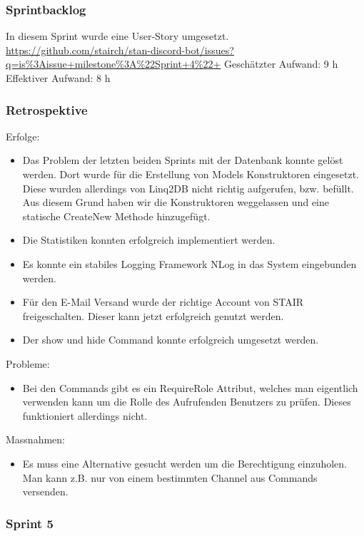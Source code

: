 \documentclass[a4paper, table]{article}
\begin{document}
\subsubsection*{Sprintbacklog}
In diesem Sprint wurde eine User-Story umgesetzt.\\
\url{https://github.com/stairch/stan-discord-bot/issues?q=is%3Aissue+milestone%3A%22Sprint+4%22+}
\newline
Geschätzter Aufwand: 9 h
\newline
Effektiver Aufwand: 8 h

\subsubsection*{Retrospektive}
Erfolge:
\begin{itemize}
    \item Das Problem der letzten beiden Sprints mit der Datenbank konnte gelöst werden.
    Dort wurde für die Erstellung von Models Konstruktoren eingesetzt.
    Diese wurden allerdings von Linq2DB nicht richtig aufgerufen, \gls{bzw.} befüllt.
    Aus diesem Grund haben wir die Konstruktoren weggelassen und eine statische CreateNew Methode hinzugefügt.
    \item Die Statistiken konnten erfolgreich implementiert werden.
    \item Es konnte ein stabiles Logging Framework NLog in das System eingebunden werden.
    \item Für den E-Mail Versand wurde der richtige Account von STAIR freigeschalten.
    Dieser kann jetzt erfolgreich genutzt werden.
    \item Der show und hide Command konnte erfolgreich umgesetzt werden.
\end{itemize}
Probleme:
\begin{itemize}
    \item Bei den Commands gibt es ein RequireRole Attribut, welches man eigentlich verwenden kann um die Rolle des Aufrufenden Benutzers zu prüfen.
    Dieses funktioniert allerdings nicht.
\end{itemize}
Massnahmen:
\begin{itemize}
    \item Es muss eine Alternative gesucht werden um die Berechtigung einzuholen.
    Man kann \gls{z.B.} nur von einem bestimmten Channel aus Commands versenden.
\end{itemize}

\newpage
\subsubsection{Sprint 5}
\end{document}
